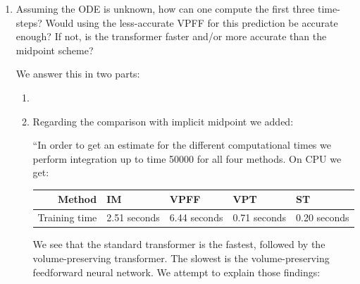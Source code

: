 \documentclass{article}
\newtheorem*{rmrk*}{Remark}
\begin{document}
\begin{enumerate}
{        \begin{rmrk*} 
            To our knowledge there is no literature on volume-preserving multi-step methods, there is however significant work on \textit{symplectic multi-step methods}. Of the two definitions of symplecticity for multi-step methods given in (Hairer et. al, 2006), that of \textit{\(G\)-symplecticity} is similar to the definition of volume preservation given here as it is also defined on a product space. The product structure through which we defined volume preservation also bears strong similarities to ``discrete multi-symplectic structures" defined in (Bridges and Reich, 2001) and (Y{\i}ld{\i}z et. al, 2024). 
        \end{rmrk*}

        }
    \item Assuming the ODE is unknown, how can one compute the first three time-steps? Would using the less-accurate VPFF for this prediction be accurate enough? If not, is the transformer faster and/or more accurate than the midpoint scheme?
        {\color{mred}
        We answer this in two parts:
        \begin{enumerate}
            \item 

            \item Regarding the comparison with implicit midpoint we added:

            ``In order to get an estimate for the different computational times we perform integration up to time 50000 for all four methods. On CPU we get:
            
            \begin{table}[h]
            \centering
            \begin{tabulary}{\linewidth}{R L L L L}
            \toprule
            \color{mred} Method & \color{mred} IM & \color{mred} VPFF & \color{mred} VPT & \color{mred} ST \\
            \toprule
            \color{mred} Training time & \color{mred} 2.51 seconds & \color{mred} 6.44 seconds & \color{mred} 0.71 seconds & \color{mred} 0.20 seconds \\
            \bottomrule
            \end{tabulary}
            
            \end{table}
            
            We see that the standard transformer is the fastest, followed by the volume-preserving transformer. The slowest is the volume-preserving feedforward neural network. We attempt to explain those findings:
            

\end{enumerate}}
\end{enumerate}
\end{document}
